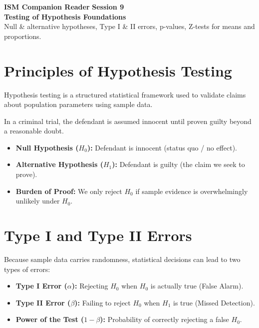 \documentclass[10pt,a4paper]{article}
\begin{document}
\begin{tcolorbox}[enhanced, colback=brandink, colframe=brandink, arc=0pt, left=12pt, right=12pt, top=12pt, bottom=12pt]
  \color{white}
  \large\textbf{ISM Companion Reader} \hfill \textbf{Session 9}\\[4pt]
  \huge\textbf{Testing of Hypothesis Foundations}\\[4pt]
  \small Null & alternative hypotheses, Type I & II errors, p-values, Z-tests for means and proportions.
\end{tcolorbox}

\vspace{10pt}

\section{Principles of Hypothesis Testing}

Hypothesis testing is a structured statistical framework used to validate claims about population parameters using sample data.

\begin{intuition}
In a criminal trial, the defendant is assumed innocent until proven guilty beyond a reasonable doubt.
\begin{itemize}
  \item \textbf{Null Hypothesis ($H_0$):} Defendant is innocent (status quo / no effect).
  \item \textbf{Alternative Hypothesis ($H_1$):} Defendant is guilty (the claim we seek to prove).
  \item \textbf{Burden of Proof:} We only reject $H_0$ if sample evidence is overwhelmingly unlikely under $H_0$.
\end{itemize}
\end{intuition}

\section{Type I and Type II Errors}

Because sample data carries randomness, statistical decisions can lead to two types of errors:
\begin{itemize}
  \item \textbf{Type I Error ($\alpha$):} Rejecting $H_0$ when $H_0$ is actually true (False Alarm).
  \item \textbf{Type II Error ($\beta$):} Failing to reject $H_0$ when $H_1$ is true (Missed Detection).
  \item \textbf{Power of the Test ($1 - \beta$):} Probability of correctly rejecting a false $H_0$.
\end{itemize}
\end{document}
